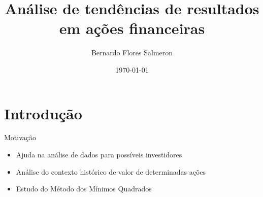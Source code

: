 \documentclass[10pt]{beamer}
\title{Análise de tendências de resultados em ações financeiras}
\date{\today}
\date{}
\author{Bernardo Flores Salmeron}
\institute{Universidade Federal da Bahia}
\newcommand{\themename}{\textbf{\textsc{metropolis}}\xspace}
\begin{document}
\maketitle


\section{Introdução}

\begin{frame}[fragile]{Motivação}

  \begin{itemize}
  \item Ajuda na análise de dados para possíveis investidores
  \newline
  \item Análise do contexto histórico de valor de determinadas ações
  \newline
  \item Estudo do Método dos Mínimos Quadrados 
  \newline
  \end{itemize}




\end{frame}
\end{document}
